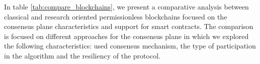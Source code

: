 % 
% 


In table \ref{tab:compare_blockchains}, we present a comparative analysis between classical and research oriented permissionless blockchains focused on the consensus plane characteristics and support for smart contracts. The comparison is focused on different approaches for the consensus plane in which we explored the following characteristics: used consensus mechanism, the type of participation in the algorithm and the resiliency of the protocol.

